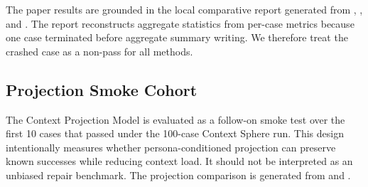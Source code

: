 The paper results are grounded in the local comparative report generated from , , and . The report reconstructs aggregate statistics from per-case metrics because one case terminated before aggregate summary writing. We therefore treat the crashed case as a non-pass for all methods.

\subsection{Projection Smoke Cohort}

The Context Projection Model is evaluated as a follow-on smoke test over the first 10 cases that passed under the 100-case Context Sphere run. This design intentionally measures whether persona-conditioned projection can preserve known successes while reducing context load. It should not be interpreted as an unbiased repair benchmark. The projection comparison is generated from  and .

